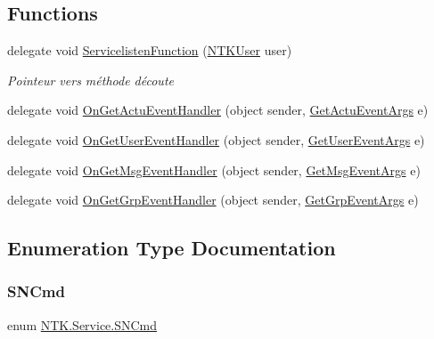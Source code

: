\subsection*{Functions}
\begin{DoxyCompactItemize}
\item 
delegate void \mbox{\hyperlink{namespace_n_t_k_1_1_service_a49f4581ae6fb3e9c155d034c47791db9}{Servicelisten\+Function}} (\mbox{\hyperlink{class_n_t_k_1_1_n_t_k_user}{N\+T\+K\+User}} user)
\begin{DoxyCompactList}\small\item\em Pointeur vers méthode d\textquotesingle{}écoute \end{DoxyCompactList}\item 
delegate void \mbox{\hyperlink{namespace_n_t_k_1_1_service_aaea6a2e360a41254ddf2d5459fd2135f}{On\+Get\+Actu\+Event\+Handler}} (object sender, \mbox{\hyperlink{class_n_t_k_1_1_events_args_1_1_get_actu_event_args}{Get\+Actu\+Event\+Args}} e)
\item 
delegate void \mbox{\hyperlink{namespace_n_t_k_1_1_service_a51bf57675f3325cb27da64ad2987252b}{On\+Get\+User\+Event\+Handler}} (object sender, \mbox{\hyperlink{class_n_t_k_1_1_events_args_1_1_get_user_event_args}{Get\+User\+Event\+Args}} e)
\item 
delegate void \mbox{\hyperlink{namespace_n_t_k_1_1_service_a937b2f893bc924fb0e8aaeac52f0f18e}{On\+Get\+Msg\+Event\+Handler}} (object sender, \mbox{\hyperlink{class_n_t_k_1_1_events_args_1_1_get_msg_event_args}{Get\+Msg\+Event\+Args}} e)
\item 
delegate void \mbox{\hyperlink{namespace_n_t_k_1_1_service_ad014f00ab4e82ad6ce8808bb063f8b31}{On\+Get\+Grp\+Event\+Handler}} (object sender, \mbox{\hyperlink{class_n_t_k_1_1_events_args_1_1_get_grp_event_args}{Get\+Grp\+Event\+Args}} e)
\end{DoxyCompactItemize}


\subsection{Enumeration Type Documentation}
\mbox{\label{namespace_n_t_k_1_1_service_ae83db80fafbeac12ad50761d34fd6882}} 
\subsubsection{\texorpdfstring{SNCmd}{SNCmd}}
{\footnotesize\ttfamily enum \mbox{\hyperlink{namespace_n_t_k_1_1_service_ae83db80fafbeac12ad50761d34fd6882}{N\+T\+K.\+Service.\+S\+N\+Cmd}}\hspace{0.3cm}{\ttfamily [strong]}}





